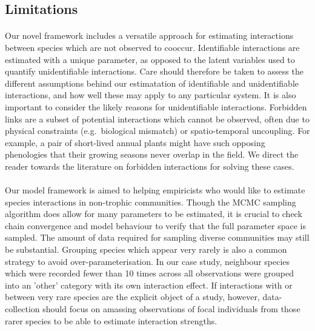 \documentclass[a4,12pt]{article}
\begin{document}
   \subsection{Limitations}


    \paragraph{}
    Our novel framework includes a versatile approach for estimating interactions between species which are not observed to cooccur. Identifiable interactions are estimated with a unique parameter, as opposed to the latent variables used to quantify unidentifiable interactions. Care should therefore be taken to assess the different assumptions behind our estimatation of identifiable and unidentifiable interactions, and how well these may apply to any particular system. It is also important to consider the likely reasons for unidentifiable interactions. Forbidden links are a subset of potential interactions which cannot be observed, often due to physical constraints (e.g.\ biological mismatch) or spatio-temporal uncoupling. For example, a pair of short-lived annual plants might have such opposing phenologies that their growing seasons never overlap in the field. We direct the reader towards the literature on forbidden interactions \parencite{Olesen2011, Jordano2016} for solving these cases. 


    \paragraph{}
    Our model framework is aimed to helping empiricists who would like to estimate species interactions in non-trophic communities. Though the MCMC sampling algorithm does allow for many parameters to be estimated, it is crucial to check chain convergence and model behaviour to verify that the full parameter space is sampled. The amount of data required for sampling diverse communities may still be substantial. Grouping species which appear very rarely is also a common strategy to avoid over-parameterisation. In our case study, neighbour species which were recorded fewer than 10 times across all observations were grouped into an 'other' category with its own interaction effect. If interactions with or between very rare species are the explicit object of a study, however, data-collection should focus on amassing observations of focal individuals from those rarer species to be able to estimate  interaction strengths.   
\end{document}
